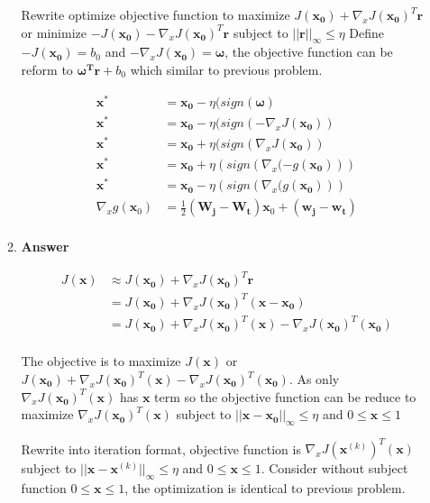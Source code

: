 \documentclass[11pt]{article}
\begin{document}
\begin{enumerate}[label=(\alph*)]
\begin{enumerate}[label=(\roman*)]
Rewrite optimize objective function to maximize $J(\mathbf{x_0}) + \nabla_x J(  \mathbf{x_0})^T \mathbf{r}$ or  minimize $-J(\mathbf{x_0}) - \nabla_x J(  \mathbf{x_0})^T \mathbf{r}$ subject to  $||\mathbf{r}||_\infty \leq \eta $ Define $-J(\mathbf{x_0}) = b_0$ and $-\nabla_x J(  \mathbf{x_0}) = \boldsymbol{\omega}$, the objective function can be reform to $ \boldsymbol{\omega^T}\mathbf{r} + b_0$ which similar to previous problem. 

\begin{align*}
\mathbf{x^*} &= \mathbf{x_0} - \eta (sign(\boldsymbol{\omega}) \\
\mathbf{x^*} &= \mathbf{x_0} - \eta (sign({-\nabla_x J(  \mathbf{x_0})}) \\
\mathbf{x^*} &= \mathbf{x_0} + \eta (sign({\nabla_x J(  \mathbf{x_0})}) \\
\mathbf{x^*} &= \mathbf{x_0} + \eta (sign({\nabla_x (-g(  \mathbf{x_0})})) \\
\mathbf{x^*} &= \mathbf{x_0} - \eta (sign({\nabla_x (g( \mathbf{x_0})})) \\
\nabla_x g(\mathbf{x}_0) &= \frac{1}{2}(\mathbf{W_j}-\mathbf{W_t})\mathbf{x}_0 + (\mathbf{w_j}-\mathbf{w_t}) \\
\end{align*}

\item \noindent\textbf{Answer}

\begin{align*}
J(\mathbf{x}) &\approx J(  \mathbf{x_0}) + \nabla_x J(  \mathbf{x_0})^T \mathbf{r} \\
&= J(  \mathbf{x_0}) + \nabla_x J(  \mathbf{x_0})^T (\mathbf{x} - \mathbf{x_0}) \\
&= J(  \mathbf{x_0}) + \nabla_x J(  \mathbf{x_0})^T (\mathbf{x}) - \nabla_x J(  \mathbf{x_0})^T(\mathbf{x_0}) \\
\end{align*}

The objective is to maximize $J(\mathbf{x})$ or $J(  \mathbf{x_0}) + \nabla_x J(  \mathbf{x_0})^T (\mathbf{x}) - \nabla_x J(  \mathbf{x_0})^T(\mathbf{x_0})$. As only $\nabla_x J(  \mathbf{x_0})^T (\mathbf{x})$ has  $\mathbf{x}$ term so the objective function can be reduce to maximize $\nabla_x J(  \mathbf{x_0})^T (\mathbf{x})$ subject to  $||\mathbf{x}-\mathbf{x_0}||_\infty \leq \eta$ and $0 \leq \mathbf{x} \leq 1$

Rewrite into iteration format, objective function is $\nabla_x J(  \mathbf{x}^{(k)})^T (\mathbf{x})$  subject to  $||\mathbf{x}-\mathbf{x}^{(k)}||_\infty \leq \eta$ and $0 \leq \mathbf{x} \leq 1$. Consider without subject function  $0 \leq \mathbf{x} \leq 1$, the optimization is identical to previous problem. 


\end{enumerate}
\end{enumerate}
\end{document}
